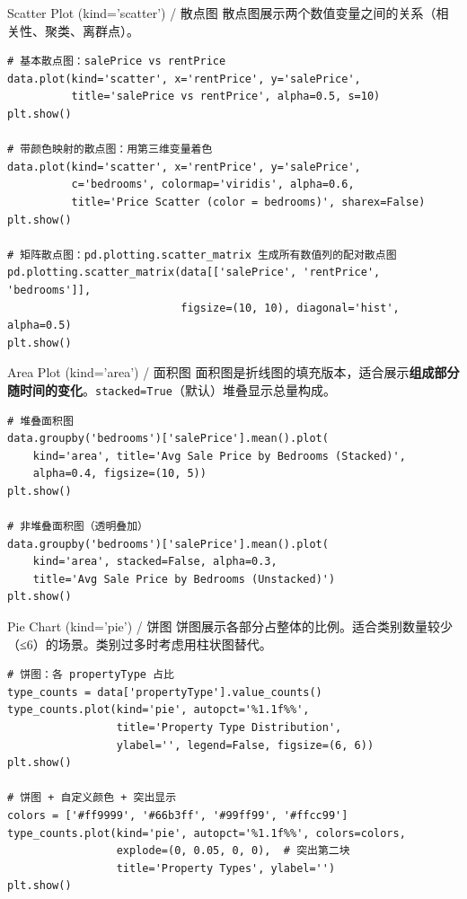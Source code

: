 \documentclass[11pt,a4paper]{report}
\let\oldtexttt\texttt
\renewcommand{\texttt}[1]{\textcolor{mainblue}{\oldtexttt{#1}}}
\begin{document}
\begin{examplebox}{Scatter Plot (kind='scatter') / 散点图}
    散点图展示两个数值变量之间的关系（相关性、聚类、离群点）。
\begin{lstlisting}
# 基本散点图：salePrice vs rentPrice
data.plot(kind='scatter', x='rentPrice', y='salePrice',
          title='salePrice vs rentPrice', alpha=0.5, s=10)
plt.show()

# 带颜色映射的散点图：用第三维变量着色
data.plot(kind='scatter', x='rentPrice', y='salePrice',
          c='bedrooms', colormap='viridis', alpha=0.6,
          title='Price Scatter (color = bedrooms)', sharex=False)
plt.show()

# 矩阵散点图：pd.plotting.scatter_matrix 生成所有数值列的配对散点图
pd.plotting.scatter_matrix(data[['salePrice', 'rentPrice', 'bedrooms']],
                           figsize=(10, 10), diagonal='hist', alpha=0.5)
plt.show()
\end{lstlisting}
\end{examplebox}

\begin{examplebox}{Area Plot (kind='area') / 面积图}
    面积图是折线图的填充版本，适合展示\textbf{组成部分随时间的变化}。\texttt{stacked=True}（默认）堆叠显示总量构成。
\begin{lstlisting}
# 堆叠面积图
data.groupby('bedrooms')['salePrice'].mean().plot(
    kind='area', title='Avg Sale Price by Bedrooms (Stacked)',
    alpha=0.4, figsize=(10, 5))
plt.show()

# 非堆叠面积图（透明叠加）
data.groupby('bedrooms')['salePrice'].mean().plot(
    kind='area', stacked=False, alpha=0.3,
    title='Avg Sale Price by Bedrooms (Unstacked)')
plt.show()
\end{lstlisting}
\end{examplebox}

\begin{examplebox}{Pie Chart (kind='pie') / 饼图}
    饼图展示各部分占整体的比例。适合类别数量较少（≤6）的场景。类别过多时考虑用柱状图替代。
\begin{lstlisting}
# 饼图：各 propertyType 占比
type_counts = data['propertyType'].value_counts()
type_counts.plot(kind='pie', autopct='%1.1f%%',
                 title='Property Type Distribution',
                 ylabel='', legend=False, figsize=(6, 6))
plt.show()

# 饼图 + 自定义颜色 + 突出显示
colors = ['#ff9999', '#66b3ff', '#99ff99', '#ffcc99']
type_counts.plot(kind='pie', autopct='%1.1f%%', colors=colors,
                 explode=(0, 0.05, 0, 0),  # 突出第二块
                 title='Property Types', ylabel='')
plt.show()
\end{lstlisting}
\end{examplebox}
\end{document}

